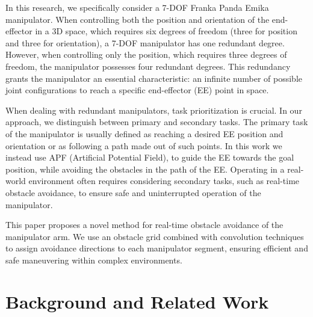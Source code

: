 \documentclass[a4paper]{article}
\begin{document}
In this research, we specifically consider a 7-DOF Franka Panda Emika~\cite{Franka2021} manipulator. When controlling both the position and orientation of the end-effector in a 3D space, which requires six degrees of freedom (three for position and three for orientation), a 7-DOF manipulator has one redundant degree. However, when controlling only the position, which requires three degrees of freedom, the manipulator possesses four redundant degrees. This redundancy grants the manipulator an essential characteristic: an infinite number of possible joint configurations to reach a specific end-effector (EE) point in space.

When dealing with redundant manipulators, task prioritization is crucial. In our approach, we distinguish between primary and secondary tasks. The primary task of the manipulator is usually defined as reaching a desired EE position and orientation or as following a path made out of such points. In this work we instead use APF (Artificial Potential Field), to guide the EE towards the goal position, while avoiding the obstacles in the path of the EE. Operating in a real-world environment often requires considering secondary tasks, such as real-time obstacle avoidance, to ensure safe and uninterrupted operation of the manipulator.

This paper proposes a novel method for real-time obstacle avoidance of the manipulator arm. We use an obstacle grid combined with convolution techniques to assign avoidance directions to each manipulator segment, ensuring efficient and safe maneuvering within complex environments. 

\section{Background and Related Work}
\end{document}

